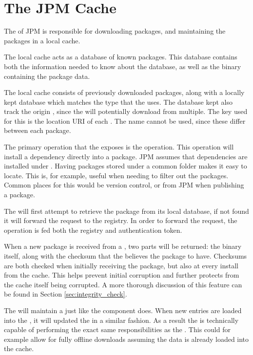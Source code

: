 \section{The JPM Cache}

The \cache of JPM is responsible for downloading packages, and maintaining the
packages in a local cache.

The local cache acts as a database of known packages. This database contains
both the information needed to know about the database, as well as the binary
containing the package data.

The local cache consists of previously downloaded packages, along with a
locally kept database which matches the type that the \registry uses. The
database kept also track the origin \registry, since the \cache will
potentially download from multiple. The key used for this is the location URI
of each \registry. The name cannot be used, since these differ between each
package.

The primary operation that the \cache exposes is the 
operation. This operation will install a dependency directly into a package.
JPM assumes that dependencies are installed under
. Having packages stored under a common
folder makes it easy to locate. This is, for example, useful when needing to
filter out the packages. Common places for this would be version control, or
from JPM when publishing a package.

The \cache will first attempt to retrieve the package from its local database,
if not found it will forward the request to the registry. In order to
forward the request, the operation is fed both the registry and
authentication token.

When a new package is received from a \registry, two parts will be returned:
the binary itself, along with the checksum that the \registry believes the
package to have. Checksums are both checked when initially receiving the
package, but also at every install from the cache. This helps prevent initial
corruption and further protects from the cache itself being corrupted. A more
thorough discussion of this feature can be found in Section
\ref{sec:integrity_check}.

The \cache will maintain a \regdb just like the \registry component does. When
new entries are loaded into the \cache, it will updated the \regdb in a similar
fashion. As a result the \cache is technically capable of performing the exact
same responsibilities as the \registry. This could for example allow for fully
offline downloads assuming the data is already loaded into the cache.

